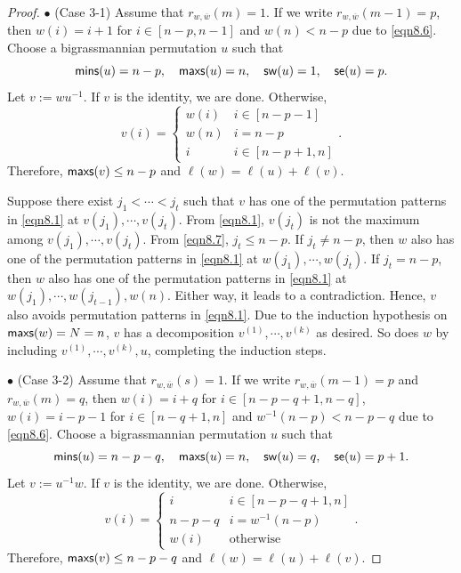 \documentclass[12pt]{amsart}
\theoremstyle{definition}
\theoremstyle{remark}
\begin{document}
\begin{proof}
$\bullet$ (Case 3-1) Assume that $r_{w , \overline{w}} (m) = 1$. If we write $r_{w , \overline{w}} (m-1) = p$, then $w(i) = i+1$ for $i \in [n-p , n-1]$ and $w (n) <n-p$ due to \eqref{eqn8.6}. Choose a bigrassmannian permutation $u$ such that
\begin{equation}
{\sf mins}(u) = n-p , \quad {\sf maxs}(u) = n , \quad {\sf sw}(u) = 1, \quad {\sf se}(u) = p.
\end{equation}
Let $v:= wu^{-1}$. If $v$ is the identity, we are done. Otherwise,
\begin{equation}\label{eqn8.7}
v (i) = 
\begin{cases}
w(i) & i \in [n-p-1] \\
w(n) & i = n-p\\
i & i \in [n-p+1 , n]
\end{cases}
.
\end{equation}
Therefore, ${\sf maxs} (v) \leq n-p$ and $\ell (w) = \ell (u) + \ell (v)$. 

Suppose there exist $j_1 < \cdots < j_t$ such that $v$ has one of the permutation patterns in \eqref{eqn8.1} at $v(j_1) , \cdots , v(j_t)$. From \eqref{eqn8.1}, $v(j_t)$ is not the maximum among $v(j_1) , \cdots , v(j_t)$. From \eqref{eqn8.7}, $j_t \leq n-p$. If $j_t \neq n-p$, then $w$ also has one of the permutation patterns in \eqref{eqn8.1} at $w(j_1) , \cdots , w(j_t)$. If $j_t = n-p$, then $w$ also has one of the permutation patterns in \eqref{eqn8.1} at $w(j_1) , \cdots , w(j_{t-1}), w(n)$. Either way, it leads to a contradiction. Hence, $v$ also avoids permutation patterns in \eqref{eqn8.1}. Due to the induction hypothesis on ${\sf maxs}(w) = N = n$, $v$ has a decomposition $v^{(1)} , \cdots , v^{(k)}$ as desired. So does $w$ by including $v^{(1)} , \cdots , v^{(k)} , u$, completing the induction steps.

$\bullet$ (Case 3-2) Assume that $r_{w , \overline{w}} (s) = 1$. If we write $r_{w , \overline{w}} (m-1) = p$ and $r_{w , \overline{w}} (m) = q$, then $w(i) = i+q$ for $i \in [n-p-q+1 , n-q]$, $w(i) = i-p-1$ for $i \in [n-q+1 , n]$ and $w^{-1} (n-p) < n-p-q$ due to \eqref{eqn8.6}. Choose a bigrassmannian permutation $u$ such that
\begin{equation}
{\sf mins}(u) = n-p-q , \quad {\sf maxs}(u) = n , \quad {\sf sw}(u) = q, \quad {\sf se}(u) = p+1.
\end{equation}
Let $v:= u^{-1} w$. If $v$ is the identity, we are done. Otherwise,
\begin{equation}\label{eqn8.8}
v (i) = 
\begin{cases}
i & i \in [n-p-q+1, n] \\
n-p-q & i = w^{-1}(n-p)\\
w(i) & \text{otherwise}
\end{cases}
.
\end{equation}
Therefore, ${\sf maxs} (v) \leq n-p-q$ and $\ell (w) = \ell (u) + \ell (v)$. 


\end{proof}
\end{document}
